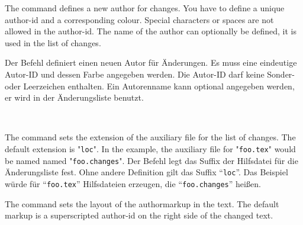 \ifENGLISH
 The command  defines a new author for changes.
 You have to define a unique author-id and a corresponding colour.
 Special characters or spaces are not allowed in the author-id.
 The name of the author can optionally be defined, it is used in the list of changes.
 \begin{einspiel}
	\>
 \end{einspiel}
\fi
	\ifGERMAN
	 Der Befehl  definiert einen neuen Autor für Änderungen.
	 Es muss eine eindeutige Autor-ID und dessen Farbe angegeben werden.
	 Die Autor-ID darf keine Sonder- oder Leerzeichen enthalten.
	 Ein Autorenname kann optional angegeben werden, er wird in der Änderungsliste benutzt.
	 \begin{einspiel}
		\>
	 \end{einspiel}
	\fi
\begin{einspiel}[true]
 \>\\
 \>
\end{einspiel}

\DescribeMacro{\setlocextension}
\ifENGLISH
 The command  sets the extension of the auxiliary file for the list of changes.
 The default extension is "\texttt{loc}".
 In the example, the auxiliary file for "\texttt{foo.tex}" would be named named "\texttt{foo.changes}".
\fi
	\ifGERMAN
	 Der Befehl  legt das Suffix der Hilfsdatei für die Änderungsliste fest.
	 Ohne andere Definition gilt das Suffix "`\texttt{loc}"'.
	 Das Beispiel würde für "`\texttt{foo.tex}"' Hilfsdateien erzeugen, die "`\texttt{foo.changes}"' heißen.
	\fi
\begin{einspiel}
 \>
\end{einspiel}
\begin{einspiel}[true]
 \>
\end{einspiel}

\DescribeMacro{\setauthormarkup}
\ifENGLISH
 The command  sets the layout of the authormarkup in the text.
 The default markup is a superscripted author-id on the right side of the changed text.

